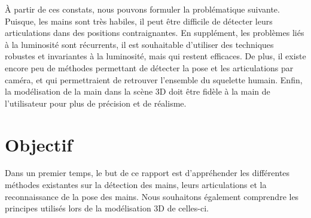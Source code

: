 À partir de ces constats, nous pouvons formuler la problématique 
suivante. Puisque, 
les mains sont très habiles, il peut être difficile de détecter leurs 
articulations dans des positions contraignantes. En supplément, les 
problèmes liés à la luminosité sont récurrents, il est souhaitable 
d'utiliser des techniques robustes et invariantes à la luminosité, 
mais qui restent efficaces. De plus, il existe encore peu de méthodes 
permettant de détecter la pose et les articulations par caméra, et 
qui permettraient de retrouver l'ensemble du squelette humain. Enfin, 
la modélisation de la main dans la scène 3D doit être fidèle à 
la main de l'utilisateur pour plus de précision et de réalisme.

\section{Objectif}
%
%
%
%

Dans un premier temps, le but de ce rapport est d'appréhender les 
différentes méthodes existantes sur la détection des mains, leurs 
articulations et la reconnaissance de la pose des mains. Nous souhaitons
également comprendre les principes utilisés lors de la modélisation 3D de
celles-ci.\\ 

